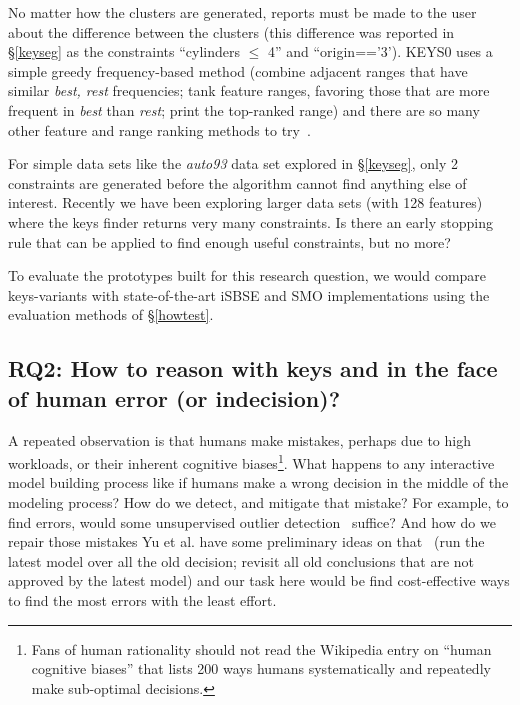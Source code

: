  
No matter how the clusters are generated, reports must be made to the user
about the difference between the clusters (this difference was reported in \S\ref{keyseg} as the constraints 
 ``cylinders $\le$ 4'' and ``origin=='3'). KEYS0 uses a  simple greedy frequency-based method
 (combine adjacent ranges that have similar {\em best, rest}
frequencies; tank feature ranges, favoring those that are more frequent in {\em best} than {\em rest}; print the top-ranked range)
and there are so many other feature and range ranking methods to try~\cite{ZHAO2021106652,hall2003benchmarking}.
  
For simple data sets like the {\em auto93} data set explored in \S\ref{keyseg},
only 2 constraints are generated before the algorithm cannot find anything else of interest.
Recently we have been exploring larger data sets (with 128 features)
where the keys finder returns very many constraints. Is there an early stopping rule
that can be applied to find enough useful constraints, but no more?

To evaluate the prototypes built for this research question, we would compare keys-variants
with state-of-the-art iSBSE and SMO implementations using the evaluation methods of \S\ref{howtest}.
  

 
 
 
\subsection{RQ2: How to reason with keys and {\IT} in the face of human error (or indecision)?}

A repeated observation is that humans make   mistakes, perhaps
due to high workloads, or their inherent cognitive biases\footnote{Fans
of human rationality should not read the Wikipedia entry on
``human cognitive biases'' that lists 200 ways humans systematically
and repeatedly make sub-optimal decisions.}.
  What happens to any interactive model building process
  like  if humans
  make a wrong decision in the middle of the modeling process?
  How 
  do we detect, and mitigate that mistake?
  For example, to find errors,
  would some unsupervised outlier detection~\cite{Nam15} suffice? And how  do we repair those mistakes
  Yu  et al. have some preliminary ideas on
  that~\cite{zhe19} (run the latest model over all the old
  decision; revisit all old conclusions that are not approved
 by the latest model) and our task here would be
 find cost-effective ways to find the most errors with the least effort.
  
